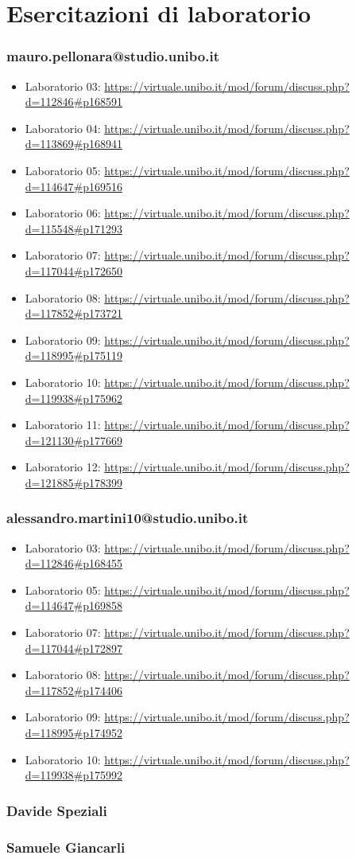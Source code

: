 \section{Esercitazioni di laboratorio}
\subsubsection*{mauro.pellonara@studio.unibo.it}
\begin{itemize}
    \item Laboratorio 03: \url{https://virtuale.unibo.it/mod/forum/discuss.php?d=112846#p168591}
    \item Laboratorio 04: \url{https://virtuale.unibo.it/mod/forum/discuss.php?d=113869#p168941}
    \item Laboratorio 05: \url{https://virtuale.unibo.it/mod/forum/discuss.php?d=114647#p169516}
    \item Laboratorio 06: \url{https://virtuale.unibo.it/mod/forum/discuss.php?d=115548#p171293}
    \item Laboratorio 07: \url{https://virtuale.unibo.it/mod/forum/discuss.php?d=117044#p172650}
    \item Laboratorio 08: \url{https://virtuale.unibo.it/mod/forum/discuss.php?d=117852#p173721}
    \item Laboratorio 09: \url{https://virtuale.unibo.it/mod/forum/discuss.php?d=118995#p175119}
    \item Laboratorio 10: \url{https://virtuale.unibo.it/mod/forum/discuss.php?d=119938#p175962}
    \item Laboratorio 11: \url{https://virtuale.unibo.it/mod/forum/discuss.php?d=121130#p177669}
    \item Laboratorio 12: \url{https://virtuale.unibo.it/mod/forum/discuss.php?d=121885#p178399}
\end{itemize}

\subsubsection*{alessandro.martini10@studio.unibo.it}
\begin{itemize}
    \item Laboratorio 03: \url{https://virtuale.unibo.it/mod/forum/discuss.php?d=112846#p168455}
    \item Laboratorio 05: \url{https://virtuale.unibo.it/mod/forum/discuss.php?d=114647#p169858}
    \item Laboratorio 07: \url{https://virtuale.unibo.it/mod/forum/discuss.php?d=117044#p172897}
    \item Laboratorio 08: \url{https://virtuale.unibo.it/mod/forum/discuss.php?d=117852#p174406}
    \item Laboratorio 09: \url{https://virtuale.unibo.it/mod/forum/discuss.php?d=118995#p174952}
    \item Laboratorio 10: \url{https://virtuale.unibo.it/mod/forum/discuss.php?d=119938#p175992}
\end{itemize}

\subsubsection*{Davide Speziali}

\subsubsection*{Samuele Giancarli}